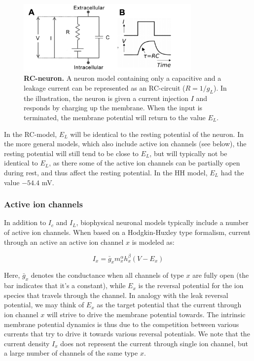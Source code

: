 \begin{figure}[!ht]
\begin{center}
\includegraphics[width=0.8\textwidth]{Fig02/RCneuron.png}
\end{center}
\caption{\textbf{RC-neuron.}  A neuron model containing only a capacitive and a leakage current can be represented as an RC-circuit ($R = 1/g_L$). In the illustration, the neuron is given a current injection $I$ and responds by charging up the membrane. When the input is terminated, the membrane potential will return to the value $E_L$.
}
\label{fig:RC}
\end{figure}

In the RC-model, $E_L$ will be identical to the resting potential of the neuron. In the more general models, which also include active ion channels (see below), the resting potential will still tend to be close to $E_L$, but will typically not be identical to $E_L$, as there some of the active ion channels can be partially open during rest, and thus affect the resting potential. In the HH model, $E_L$ had the value $-54.4$ mV. 


\subsubsection{Active ion channels}
In addition to $I_c$ and $I_L$, biophysical neuronal models typically include a number of active ion channels. When based on a Hodgkin-Huxley type formalism, current through an active an active ion channel $x$ is modeled as:

\begin{equation}
I_x = \bar{g}_x m_x^{\alpha} h_x^{\beta}(V-E_x)
\label{eq:HHform}
\end{equation}

Here, $\bar{g}_x$ denotes the conductance when all channels of type $x$ are fully open (the bar indicates that it's a constant), while $E_x$ is the reversal potential for the ion species that travels through the channel. In analogy with the leak reversal potential, we may think of $E_x$ as the target potential that the current through ion channel $x$ will strive to drive the membrane potential towards. The intrinsic membrane potential dynamics is thus due to the competition between various currents that try to drive it towards various reversal potentials. We note that the current density $I_x$ does not represent the current through single ion channel, but a large number of channels of the same type $x$. 

